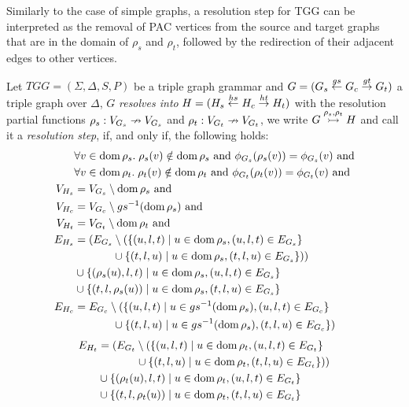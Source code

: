 Similarly to the case of simple graphs, a resolution step for TGG can be interpreted as the removal of PAC vertices from the source and target graphs that are in the domain of $\rho_s$ and $\rho_t$, followed by the redirection of their adjacent edges to other vertices.

\begin{definition}
	\label{def:tresolv}
	Let $TGG = (\Sigma, \Delta, S, P)$ be a triple graph grammar and $G = (G_s \overset{gs}{\leftarrow} G_c \overset{gt}{\rightarrow} G_t)$ a triple graph over $\Delta$, $G$ \emph{resolves into} $H = (H_s \overset{hs}{\leftarrow} H_c \overset{ht}{\rightarrow} H_t)$ with the resolution partial functions $\rho_s: V_{G_s} \nrightarrow V_{G_s}$ and $\rho_t: V_{G_t} \nrightarrow V_{G_t}$, we write $G \overset{\rho_s, \rho_t}{\rightarrowtail} H$ and call it a \emph{resolution step}, if, and only if, the following holds:
	\begin{align*}
	& \forall v \in \operatorname{dom} \rho_s . \; \rho_s(v) \notin \operatorname{dom} \rho_s \text{ and } \phi_{G_s}(\rho_s(v)) = \phi_{G_s}(v) \text{ and}\\
	& \forall v \in \operatorname{dom} \rho_t . \; \rho_t(v) \notin \operatorname{dom} \rho_t \text{ and } \phi_{G_t}(\rho_t(v)) = \phi_{G_t}(v) \text{ and}\\
	V_{H_s} & = V_{G_s} \setminus \operatorname{dom}  \rho_s\text{ and}\\
	V_{H_c} & = V_{G_c} \setminus gs^{-1}(\operatorname{dom}  \rho_s) \text{ and}\\
	V_{H_t} & = V_{G_t} \setminus \operatorname{dom}  \rho_t\text{ and}\\
	E_{H_s} & = (E_{G_s} \setminus (\{(u,l,t) \; | \; u \in \operatorname{dom} \rho_s, (u,l,t) \in E_{G_s}\} \\
			&\hspace{3.5em} \cup \{(t,l,u) \; | \; u \in \operatorname{dom} \rho_s, (t,l,u) \in E_{G_s}\}))\\
	& \cup \{(\rho_s(u),l,t) \; | \; u \in \operatorname{dom} \rho_s, (u,l,t) \in E_{G_s}\} \\
	& \cup \{(t,l,\rho_s(u)) \; | \; u \in \operatorname{dom} \rho_s, (t,l,u) \in E_{G_s}\} \\
	E_{H_c} & = E_{G_c} \setminus (\{(u,l,t) \; | \; u \in gs^{-1}(\operatorname{dom} \rho_s), (u,l,t) \in E_{G_c}\} \\
	&\hspace{3.5em} \cup \{(t,l,u) \; | \; u \in gs^{-1}(\operatorname{dom} \rho_s), (t,l,u) \in E_{G_c}\})
	\end{align*}
	\begin{align*}
	E_{H_t} & = (E_{G_t} \setminus (\{(u,l,t) \; | \; u \in \operatorname{dom} \rho_t, (u,l,t) \in E_{G_t}\} \\
	&\hspace{3.5em} \cup \{(t,l,u) \; | \; u \in \operatorname{dom} \rho_t, (t,l,u) \in E_{G_t}\}))\\
	& \cup \{(\rho_t(u),l,t) \; | \; u \in \operatorname{dom} \rho_t, (u,l,t) \in E_{G_t}\} \\
	& \cup \{(t,l,\rho_t(u)) \; | \; u \in \operatorname{dom} \rho_t, (t,l,u) \in E_{G_t}\}
	\end{align*}
\end{definition}


